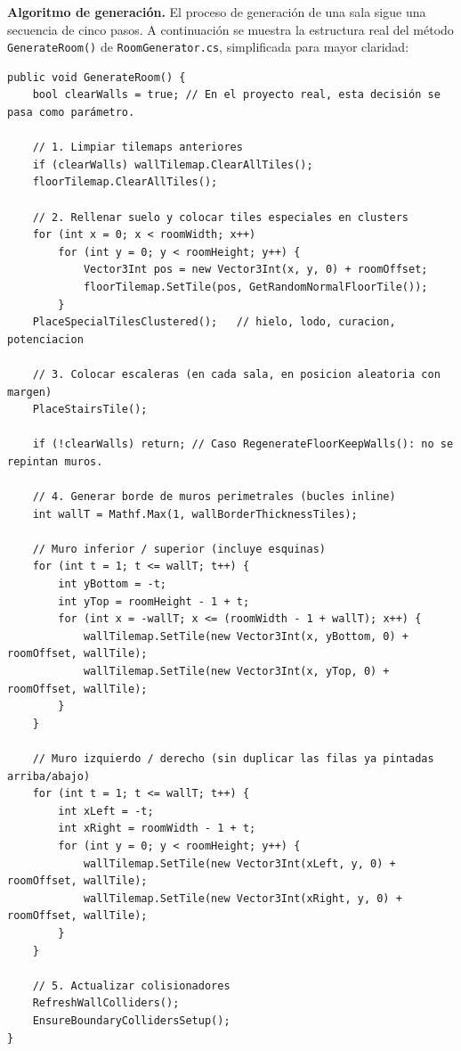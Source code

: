 \textbf{Algoritmo de generación.} El proceso de generación de una sala sigue una secuencia de cinco pasos. A continuación se muestra la estructura real del método \texttt{GenerateRoom()} de \texttt{RoomGenerator.cs}, simplificada para mayor claridad:

\begin{lstlisting}
public void GenerateRoom() {
    bool clearWalls = true; // En el proyecto real, esta decisión se pasa como parámetro.

    // 1. Limpiar tilemaps anteriores
    if (clearWalls) wallTilemap.ClearAllTiles();
    floorTilemap.ClearAllTiles();

    // 2. Rellenar suelo y colocar tiles especiales en clusters
    for (int x = 0; x < roomWidth; x++)
        for (int y = 0; y < roomHeight; y++) {
            Vector3Int pos = new Vector3Int(x, y, 0) + roomOffset;
            floorTilemap.SetTile(pos, GetRandomNormalFloorTile());
        }
    PlaceSpecialTilesClustered();   // hielo, lodo, curacion, potenciacion

    // 3. Colocar escaleras (en cada sala, en posicion aleatoria con margen)
    PlaceStairsTile();

    if (!clearWalls) return; // Caso RegenerateFloorKeepWalls(): no se repintan muros.

    // 4. Generar borde de muros perimetrales (bucles inline)
    int wallT = Mathf.Max(1, wallBorderThicknessTiles);

    // Muro inferior / superior (incluye esquinas)
    for (int t = 1; t <= wallT; t++) {
        int yBottom = -t;
        int yTop = roomHeight - 1 + t;
        for (int x = -wallT; x <= (roomWidth - 1 + wallT); x++) {
            wallTilemap.SetTile(new Vector3Int(x, yBottom, 0) + roomOffset, wallTile);
            wallTilemap.SetTile(new Vector3Int(x, yTop, 0) + roomOffset, wallTile);
        }
    }

    // Muro izquierdo / derecho (sin duplicar las filas ya pintadas arriba/abajo)
    for (int t = 1; t <= wallT; t++) {
        int xLeft = -t;
        int xRight = roomWidth - 1 + t;
        for (int y = 0; y < roomHeight; y++) {
            wallTilemap.SetTile(new Vector3Int(xLeft, y, 0) + roomOffset, wallTile);
            wallTilemap.SetTile(new Vector3Int(xRight, y, 0) + roomOffset, wallTile);
        }
    }

    // 5. Actualizar colisionadores
    RefreshWallColliders();
    EnsureBoundaryCollidersSetup();
}
\end{lstlisting}


